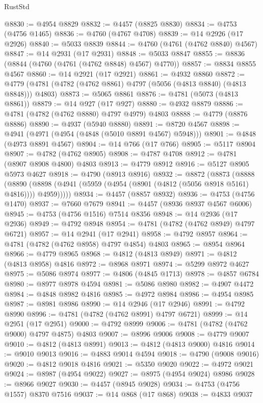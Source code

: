 \begin{lexlean}{RustStd}
\begin{coremodule}
@8830 := @4954 @8829
@8832 := @4457 (@8825 @8830)
@8834 := @4753 (@4756 @1465)
@8836 := @4760 (@4767 @4708)
@8839 := @14 @2926 (@17 @2926)
@8840 := @5033 @8839
@8844 := @4760 (@4761 (@4762 @8840) @4567)
@8847 := @14 @2931 (@17 @2931)
@8848 := @5033 @8847
@8855 := @8836 (@8844 (@4760 (@4761 (@4762 @8848) @4567) @4770))
@8857 := @8834 @8855 @4567
@8860 := @14 @2921 (@17 @2921)
@8861 := @4932 @8860
@8872 := @4779 (@4781 (@4782 (@4762 @8861) @4797 (@5056 (@4813 @8840) (@4813 @8848))) @4803)
@8873 := @5065 @8861
@8876 := @4781 (@5073 (@4813 @8861))
@8879 := @14 @927 (@17 @927)
@8880 := @4932 @8879
@8886 := @4781 (@4782 (@4762 @8880) @4797 @4979) @4803
@8888 := @4779 (@8876 @8886)
@8890 := @4937 (@5940 @8880)
@8891 := @8720 @4567
@8898 := @4941 (@4971 (@4954 (@4848 (@5010 @8891 @4567) @5948)))
@8901 := @4848 (@4973 @8891 @4567)
@8904 := @14 @766 (@17 @766)
@8905 := @5117 @8904
@8907 := @4782 (@4762 @8905)
@8908 := @4787 @4708
@8912 := @4781 (@8907 @8908 @4800) @4803
@8913 := @4779 @8912
@8916 := @5127 @8905 @5973 @4627
@8918 := @4790 (@8913 @8916)
@8932 := @8872
    (@8873
      (@8888
        (@8890 (@8898 (@4941 (@5959 (@4954 (@8901 (@4812 (@5056 @8918 @5161) @4816)))) @4959)))))
@8934 := @4457 (@8857 @8932)
@8936 := @4753 (@4756 @1470)
@8937 := @7660 @7679
@8941 := @4457 (@8936 @8937 @4567 @6006)
@8945 := @4753 (@4756 @1516) @7514 @8356
@8948 := @14 @2936 (@17 @2936)
@8949 := @4792 @8948
@8954 := @4781 (@4782 (@4762 @8949) @4797 @6721)
@8957 := @14 @2941 (@17 @2941)
@8958 := @4792 @8957
@8964 := @4781 (@4782 (@4762 @8958) @4797 @4854) @4803
@8965 := @8954 @8964
@8966 := @4779 @8965
@8968 := @4812 (@4813 @8949)
@8971 := @4812 (@4813 @8958) @4816
@8972 := @8968 @8971
@8974 := @5299 @8972 @4627
@8975 := @5086 @8974
@8977 := @4806 (@4845 @1713)
@8978 := @4857 @6784
@8980 := @8977 @8978 @4594
@8981 := @5086 @8980
@8982 := @4907 @4472
@8984 := @4848 @8982 @4816
@8985 := @4972 @8984
@8986 := @4954 @8985
@8987 := @8981 @8986
@8990 := @14 @2946 (@17 @2946)
@8991 := @4792 @8990
@8996 := @4781 (@4782 (@4762 @8991) @4797 @6721)
@8999 := @14 @2951 (@17 @2951)
@9000 := @4792 @8999
@9006 := @4781 (@4782 (@4762 @9000) @4797 @4875) @4803
@9007 := @8996 @9006
@9008 := @4779 @9007
@9010 := @4812 (@4813 @8991)
@9013 := @4812 (@4813 @9000) @4816
@9014 := @9010 @9013
@9016 := @4883 @9014 @4594
@9018 := @4790 (@9008 @9016)
@9020 := @4812 @9018 @4816
@9021 := @5350 @9020
@9022 := @4972 @9021
@9024 := @8987 (@4954 @9022)
@9027 := @8975 (@4954 @9024) @8986
@9028 := @8966 @9027
@9030 := @4457 (@8945 @9028)
@9034 := @4753 (@4756 @1557) @8370 @7516
@9037 := @14 @868 (@17 @868)
@9038 := @4833 @9037

\end{coremodule}
\end{lexlean}
